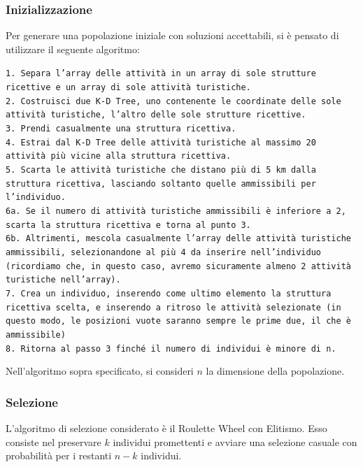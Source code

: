 \documentclass{CSUniSchoolLabReport}
\begin{document}
\subsubsection{Inizializzazione}

Per generare una popolazione iniziale con soluzioni accettabili, si è pensato di utilizzare il seguente algoritmo:

\texttt{1. Separa l'array delle attività in un array di sole strutture ricettive e un array di sole attività turistiche. \\
2. Costruisci due K-D Tree, uno contenente le coordinate delle sole attività turistiche, l'altro delle sole strutture ricettive. \\
3. Prendi casualmente una struttura ricettiva. \\
4. Estrai dal K-D Tree delle attività turistiche al massimo 20 attività più vicine alla struttura ricettiva. \\
5. Scarta le attività turistiche che distano più di 5 km dalla struttura ricettiva, lasciando soltanto quelle ammissibili per l'individuo. \\
6a. Se il numero di attività turistiche ammissibili è inferiore a 2, scarta la struttura ricettiva e torna al punto 3. \\
6b. Altrimenti, mescola casualmente l'array delle attività turistiche ammissibili, selezionandone al più 4 da inserire nell'individuo (ricordiamo che, in questo caso, avremo sicuramente almeno 2 attività turistiche nell'array). \\
7. Crea un individuo, inserendo come ultimo elemento la struttura ricettiva scelta, e inserendo a ritroso le attività selezionate (in questo modo, le posizioni vuote saranno sempre le prime due, il che è ammissibile) \\
8. Ritorna al passo 3 finché il numero di individui è minore di n. 
}

Nell'algoritmo sopra specificato, si consideri $n$ la dimensione della popolazione.

\pagebreak{}
\subsubsection{Selezione}

L'algoritmo di selezione considerato è il Roulette Wheel con Elitismo. Esso consiste nel preservare $k$ individui promettenti e avviare una selezione casuale con probabilità per i restanti $n-k$ individui.
\end{document}
